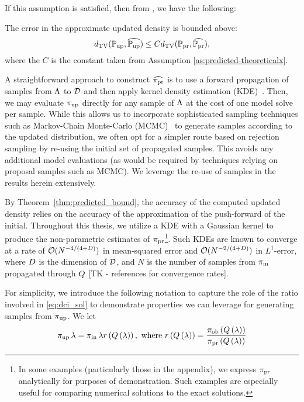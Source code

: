 If this assumption is satisfied, then from \cite{BJW18}, we have the following:
\begin{thm}\label{thm:predicted_bound}
  The error in the approximate updated density is bounded above:
  \begin{equation}\label{eq:predicted_bound}
    d_{\text{TV}} (\operatorname*{\mathbb{P}_{up}}, \widehat{\operatorname*{\mathbb{P}_{up}}}) \leq C d_{\text{TV}} (\operatorname*{\mathbb{P}_{pr}}, \widehat{\operatorname*{\mathbb{P}_{pr}}}),
  \end{equation}
  where the $C$ is the constant taken from Assumption \ref{as:predicted-theoreticalx}.
\end{thm}

A straightforward approach to construct $\widehat{\operatorname*{\pi_{pr}}}$ is to use a forward propagation of samples from ${\Lambda}$ to $\mathcal{D}$ and then apply kernel density estimation (KDE)~\cite{BJW18}.
Then, we may evaluate $\operatorname*{\pi_{up}}$ directly for any sample of ${\Lambda}$ at the cost of one model solve per sample.
While this allows us to incorporate sophisticated sampling techniques such as Markov-Chain Monte-Carlo (MCMC)~\cite{Smith, Tarantola_book} to generate samples according to the updated distribution, we often opt for a simpler route based on rejection sampling by re-using the initial set of propagated samples.
This avoids any additional model evaluations (as would be required by techniques relying on proposal samples such as MCMC).
We leverage the re-use of samples in the results herein extensively.

By Theorem~\ref{thm:predicted_bound}, the accuracy of the computed updated density relies on the accuracy of the approximation of the push-forward of the initial.
Throughout this thesis, we utilize a KDE with a Gaussian kernel to produce the non-parametric estimates of $\operatorname*{\pi_{pr}}$\footnote{
In some examples (particularly those in the appendix), we express $\operatorname*{\pi_{pr}}$ analytically for purposes of demonstration.
Such examples are especially useful for comparing numerical solutions to the exact solutions.
}.
Such KDEs are known to converge at a rate of $\mathcal{O}(N^{-4/(4+D)})$ in mean-squared error and $\mathcal{O}(N^{-2/(4+D)})$ in $L^1$-error, where $D$ is the dimension of $\mathcal{D}$, and $N$ is the number of samples from $\operatorname*{\pi_{in}}$ propagated through $Q$ [TK - references for convergence rates].

For simplicity, we introduce the following notation to capture the role of the ratio involved in \eqref{eq:dci_sol} to demonstrate properties we can leverage for generating samples from $\operatorname*{\pi_{up}}$.
We let
\[
\operatorname*{\pi_{up}}\lambda = \operatorname*{\pi_{in}} \lambda r\left ( Q\left ( \lambda \right ) \right ), \text{ where } r\left ( Q\left ( \lambda \right ) \right ) = \frac{\operatorname*{\pi_{ob}}\left ( Q\left ( \lambda \right ) \right )}{\operatorname*{\pi_{pr}}\left ( Q\left ( \lambda \right ) \right )}
\]

